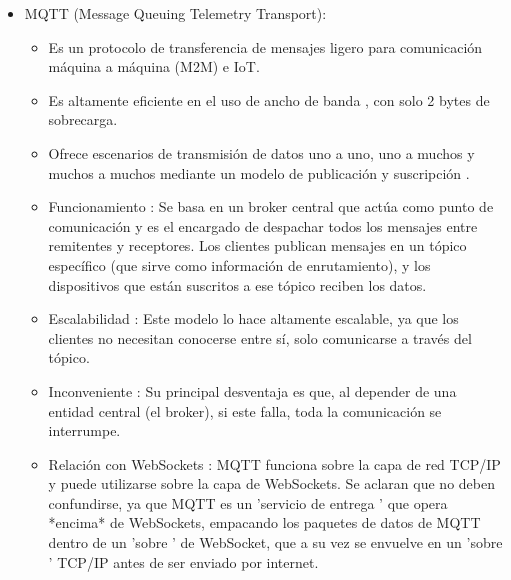 \documentclass{report}
\begin{document}
\begin{itemize}
    \item MQTT (Message Queuing Telemetry Transport):
    \begin{itemize}
        \item Es un protocolo de transferencia de mensajes  ligero  para comunicación máquina a máquina (M2M) e IoT.
        \item Es altamente  eficiente en el uso de ancho de banda , con solo 2 bytes de sobrecarga.
        \item Ofrece escenarios de transmisión de datos  uno a uno, uno a muchos y muchos a muchos  mediante un  modelo de publicación y suscripción .
        \item Funcionamiento : Se basa en un  broker  central que actúa como punto de comunicación y es el encargado de despachar todos los mensajes 
        entre remitentes y receptores. Los clientes publican mensajes en un  tópico  específico (que sirve como información de enrutamiento), y los 
        dispositivos que están suscritos a ese tópico reciben los datos.
        \item Escalabilidad : Este modelo lo hace altamente escalable, ya que los clientes no necesitan conocerse entre sí, solo comunicarse a través 
        del tópico.
        \item Inconveniente : Su principal desventaja es que, al depender de una entidad central (el broker), si este falla, toda la comunicación se interrumpe.
        \item Relación con WebSockets : MQTT funciona sobre la capa de red TCP/IP y puede utilizarse sobre la capa de WebSockets. Se aclaran 
        que no deben confundirse, ya que MQTT es un  'servicio de entrega ' que opera *encima* de WebSockets, empacando los paquetes de datos de MQTT 
        dentro de un  'sobre ' de WebSocket, que a su vez se envuelve en un  'sobre ' TCP/IP antes de ser enviado por internet.
    \end{itemize}


\end{itemize}
\end{document}
